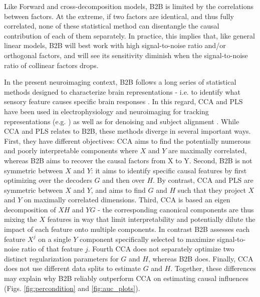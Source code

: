 \documentclass[preprint,12pt,3p]{elsarticle}
\begin{document}
Like Forward and cross-decomposition models, B2B is limited by the correlations
between factors. At the extreme, if two factors are identical, and thus fully
correlated, none of these statistical method can disentangle the causal
contribution of each of them separately. In practice, this implies that, like
general linear models, B2B will best work with high signal-to-noise ratio and/or
orthogonal factors, and will see its sensitivity diminish when the
signal-to-noise ratio of collinear factors drops.

In the present neuroimaging context, B2B follows a long series of statistical
methods designed to characterize brain representations - i.e. to identify what
sensory feature causes specific brain responses \citep{naselaris2011encoding}.
In this regard, CCA and PLS have been used in electrophysiology and neuroimaging
for tracking representations (e.g. \citep{musch2020transformation}) as well as
for denoising and subject alignment \citep{cca_hotelling, de2019multiway}. While
CCA and PLS relates to B2B, these methods diverge in several important ways.
First, they have different objectives: CCA aims to find the potentially numerous and poorly
interpretable components where $X$ and $Y$ are maximally correlated, whereas B2B
aims to recover the causal factors from X to Y. Second, B2B is not symmetric
between $X$ and $Y$: it aims to identify specific causal features by first
optimizing over the decoders $G$ and then over $H$. By contrast, CCA and PLS are
symmetric between $X$ and $Y$, and aims to find $G$ and $H$ such that they
project $X$ and $Y$ on maximally correlated dimensions. Third, CCA is based an
eigen decomposition of $XH$ and $YG$ - the corresponding canonical components
are thus mixing the $X$ features in way that limit interpretability and
potentially dilute the impact of each feature onto multiple components. In
contrast B2B assesses each feature $X^j$ on a single $Y$ component specifically
selected to maximize signal-to-noise ratio of that feature $j$. Fourth CCA does
not separately optimize two distinct regularization parameters for $G$ and $H$,
whereas B2B does. Finally, CCA does not use different data splits to
estimate $G$ and $H$. Together, these differences may explain why B2B reliably
outperform CCA on estimating causal influences (Figs. \ref{fig:percondition} and
\ref{fig:auc_plots}).
\end{document}
